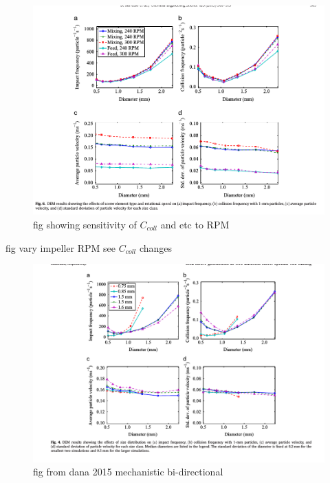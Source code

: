 \documentclass[preprint,11pt,authoryear]{elsarticle}
\begin{document}
	      \begin{figure}[H]
	      \centering
	      \includegraphics[scale=0.5]{dana_quad_impact_coll_vs_RPM}
	      \caption{ fig showing sensitivity of $C_{coll}$ and etc to RPM}
	      \label{fig:rslts_psd_velocity}
	      \end{figure} 
	        
	    \par fig vary impeller RPM see $C_{coll}$ changes
	      \begin{figure}[H]
	      \centering
	      \includegraphics[scale=0.5]{rslts_dem_psd_velocity}
	      \caption{ fig from dana 2015 mechanistic bi-directional}
	      \label{fig:rslts_psd_velocity}
	      \end{figure}
	      
\end{document}

